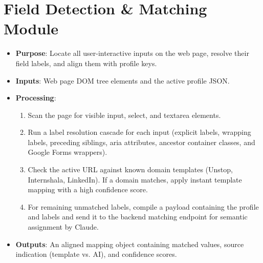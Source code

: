 \documentclass[12pt,a4paper]{report}
\begin{document}
\section{Field Detection \& Matching Module}
\begin{itemize}
    \item \textbf{Purpose}: Locate all user-interactive inputs on the web page, resolve their field labels, and align them with profile keys.
    \item \textbf{Inputs}: Web page DOM tree elements and the active profile JSON.
    \item \textbf{Processing}: 
    \begin{enumerate}
        \item Scan the page for visible input, select, and textarea elements.
        \item Run a label resolution cascade for each input (explicit labels, wrapping labels, preceding siblings, aria attributes, ancestor container classes, and Google Forms wrappers).
        \item Check the active URL against known domain templates (Unstop, Internshala, LinkedIn). If a domain matches, apply instant template mapping with a high confidence score.
        \item For remaining unmatched labels, compile a payload containing the profile and labels and send it to the backend matching endpoint for semantic assignment by Claude.
    \end{enumerate}
    \item \textbf{Outputs}: An aligned mapping object containing matched values, source indication (template vs. AI), and confidence scores.
\end{itemize}
\end{document}
